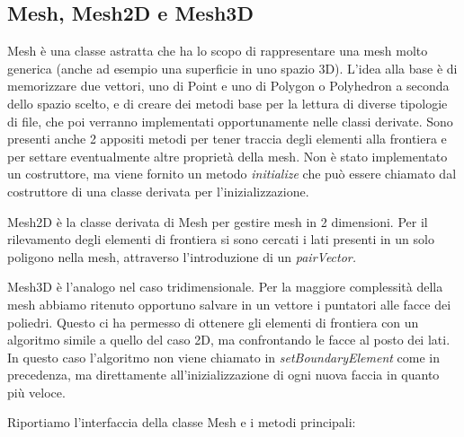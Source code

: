 \documentclass[oneside,12pt]{book}  %
\theoremstyle{plain}
\theoremstyle{definition}
\theoremstyle{remark}
\numberwithin{equation}{chapter} %
\begin{document}
\subsection{Mesh, Mesh2D e Mesh3D}
Mesh \`e una classe astratta che ha lo scopo di rappresentare
una mesh molto generica (anche ad esempio una superficie in uno spazio
3D). L'idea alla base \`e di memorizzare due vettori, uno di Point e
uno di Polygon o Polyhedron a seconda dello spazio scelto, e di creare
dei metodi base per la lettura di diverse tipologie di file, che poi
verranno implementati opportunamente nelle classi derivate. Sono
presenti anche 2 appositi metodi per tener traccia degli elementi alla
frontiera e per settare eventualmente altre propriet\`a della mesh. Non \`e
stato implementato un costruttore, ma viene fornito un metodo
\textit{initialize} che pu\`o essere chiamato dal costruttore di una
classe derivata per l'inizializzazione.

Mesh2D \`e la classe derivata di Mesh per gestire mesh in 2
dimensioni. Per il rilevamento degli elementi di frontiera si sono
cercati i lati presenti in un solo poligono nella mesh, attraverso
l'introduzione di un \textit{pairVector.}

Mesh3D \`e l'analogo nel caso tridimensionale. Per la maggiore
complessit\`a della mesh abbiamo ritenuto opportuno salvare in un
vettore i puntatori alle facce dei poliedri. Questo ci ha permesso di
ottenere gli elementi di frontiera con un algoritmo simile a quello
del caso 2D, ma confrontando le facce al posto dei lati. In questo
caso l'algoritmo non viene chiamato in \textit{setBoundaryElement}
come in precedenza, ma direttamente all'inizializzazione di ogni nuova
faccia in quanto pi\`u veloce.

Riportiamo l'interfaccia della classe Mesh e i metodi principali:
\end{document}
